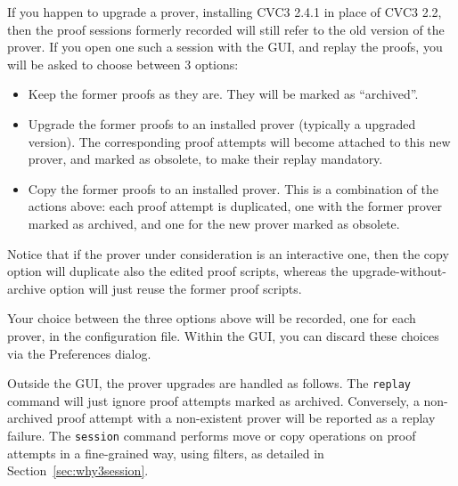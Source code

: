 If you happen to upgrade a prover, \eg installing CVC3 2.4.1 in place
of CVC3 2.2, then the proof sessions formerly recorded will still
refer to the old version of the prover. If you open one such a session
with the GUI, and replay the proofs, you will be asked to choose
between 3 options:
\begin{itemize}
\item Keep the former proofs as they are. They will be marked as
  ``archived''.
\item Upgrade the former proofs to an installed prover (typically a
  upgraded version). The corresponding proof attempts will become
  attached to this new prover, and marked as obsolete,
  to make their replay mandatory.
\item Copy the former proofs to an installed prover. This is a
  combination of the actions above: each proof attempt is duplicated,
  one with the former prover marked as archived, and one for the new
  prover marked as obsolete.
\end{itemize}

Notice that if the prover under consideration is an interactive one, then
the copy option will duplicate also the edited proof scripts, whereas
the upgrade-without-archive option will just reuse the former proof scripts.

Your choice between the three options above will be recorded, one for
each prover, in the \why configuration file. Within the GUI, you can
discard these choices via the \textsf{Preferences} dialog.

Outside the GUI, the prover upgrades are handled as follows. The
\texttt{replay} command will just ignore proof attempts marked as
archived.
Conversely, a non-archived proof attempt with a non-existent
prover will be reported as a replay failure. The
\texttt{session} command performs move or copy operations on
proof attempts in a fine-grained way, using filters, as detailed in
Section~\ref{sec:why3session}.




